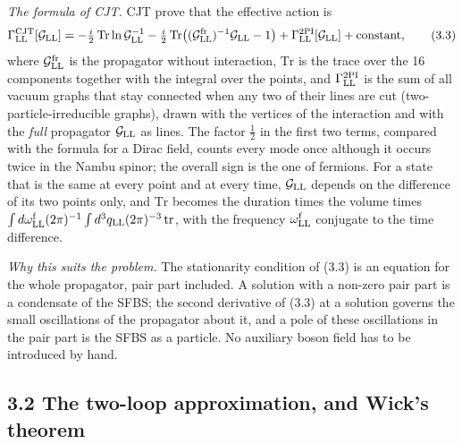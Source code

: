 \documentclass[
  10pt,
]{article}
\begin{document}
\emph{The formula of CJT.} CJT prove that the effective action is
\[\Gamma^{\rm CJT}_{\rm LL}[\mathcal G_{\rm LL}]=-\tfrac i2\,\mathrm{Tr}\ln\mathcal G_{\rm LL}^{-1}
-\tfrac i2\,\mathrm{Tr}\big((\mathcal G^{\rm fr}_{\rm LL})^{-1}\mathcal G_{\rm LL}-1\big)
+\Gamma^{\rm 2PI}_{\rm LL}[\mathcal G_{\rm LL}]+\text{constant},\tag{3.3}\]
where \(\mathcal G^{\rm fr}_{\rm LL}\) is the propagator without
interaction, \(\mathrm{Tr}\) is the trace over the 16 components
together with the integral over the points, and
\(\Gamma^{\rm 2PI}_{\rm LL}\) is the sum of all vacuum graphs that stay
connected when any two of their lines are cut (two-particle-irreducible
graphs), drawn with the vertices of the interaction and with the
\emph{full} propagator \(\mathcal G_{\rm LL}\) as lines. The factor
\(\tfrac12\) in the first two terms, compared with the formula for a
Dirac field, counts every mode once although it occurs twice in the
Nambu spinor; the overall sign is the one of fermions. For a state that
is the same at every point and at every time, \(\mathcal G_{\rm LL}\)
depends on the difference of its two points only, and \(\mathrm{Tr}\)
becomes the duration times the volume times
\(\int d\omega^{\rm f}_{\rm LL}(2\pi)^{-1}\int d^3q_{\rm LL}(2\pi)^{-3}\,\mathrm{tr}\),
with the frequency \(\omega^{\rm f}_{\rm LL}\) conjugate to the time
difference.

\emph{Why this suits the problem.} The stationarity condition of (3.3)
is an equation for the whole propagator, pair part included. A solution
with a non-zero pair part is a condensate of the SFBS; the second
derivative of (3.3) at a solution governs the small oscillations of the
propagator about it, and a pole of these oscillations in the pair part
is the SFBS as a particle. No auxiliary boson field has to be introduced
by hand.

\hypertarget{the-two-loop-approximation-and-wicks-theorem}{%
\subsection{3.2 The two-loop approximation, and Wick's
theorem}\label{the-two-loop-approximation-and-wicks-theorem}}
\end{document}

